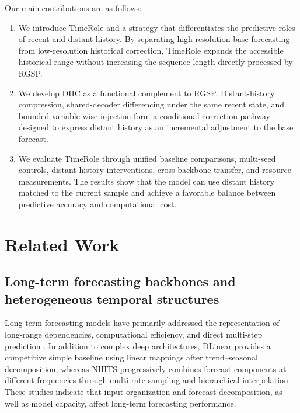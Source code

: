 Our main contributions are as follows:

\begin{enumerate}
\def\labelenumi{\arabic{enumi}.}
\tightlist
\item
  We introduce TimeRole and a strategy that differentiates the predictive roles of recent and distant history. By separating high-resolution base forecasting from low-resolution historical correction, TimeRole expands the accessible historical range without increasing the sequence length directly processed by RGSP.
\item
  We develop DHC as a functional complement to RGSP. Distant-history compression, shared-decoder differencing under the same recent state, and bounded variable-wise injection form a conditional correction pathway designed to express distant history as an incremental adjustment to the base forecast.
\item
  We evaluate TimeRole through unified baseline comparisons, multi-seed controls, distant-history interventions, cross-backbone transfer, and resource measurements. The results show that the model can use distant history matched to the current sample and achieve a favorable balance between predictive accuracy and computational cost.
\end{enumerate}

\section{Related Work}

\subsection{Long-term forecasting backbones and heterogeneous temporal structures}

Long-term forecasting models have primarily addressed the representation of long-range dependencies, computational efficiency, and direct multi-step prediction \citep{Lim2021DeepForecastSurvey,Wen2023TransformerSurvey}. In addition to complex deep architectures, DLinear provides a competitive simple baseline using linear mappings after trend--seasonal decomposition, whereas NHITS progressively combines forecast components at different frequencies through multi-rate sampling and hierarchical interpolation \citep{Zeng2023DLinear,Challu2023NHITS}. These studies indicate that input organization and forecast decomposition, as well as model capacity, affect long-term forecasting performance.

